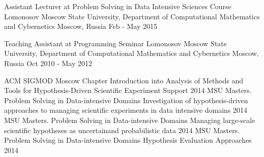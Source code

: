 \begin{cventries}
\cventry
    {Assistant Lecturer at Problem Solving in Data Intensive Sciences Course}
    {Lomonosov Moscow State University, Department of Computational Mathematics and Cybernetics}
    {Moscow, Russia}
    {Feb - May 2015}
    {
    }

\cventry
    {Teaching Assistant at Programming Seminar}
    {Lomonosov Moscow State University, Department of Computational Mathematics and Cybernetics}
    {Moscow, Russia}
    {Oct 2010 - May 2012}
    {
    }
\end{cventries}

\begin{cvhonors}
  \cvhonor
    {ACM SIGMOD Moscow Chapter}
    {Introduction into Analysis of Methods and Tools for Hypothesis-Driven Scientific Experiment Support}
    {}
    {2014}
  \cvhonor
    {MSU Masters. Problem Solving in Data-intensive Domains}
    {Investigation of hypothesis-driven approaches to managing scientific experiments in data intensive domains}
    {}
    {2014}
  \cvhonor
    {MSU Masters. Problem Solving in Data-intensive Domains}
    {Managing large-scale scientific hypotheses as uncertainand probabilistic data}
    {}
    {2014}
  \cvhonor
    {MSU Masters. Problem Solving in Data-intensive Domains}
    {Hypothesis Evaluation Approaches}
    {}
    {2014}
\end{cvhonors}
